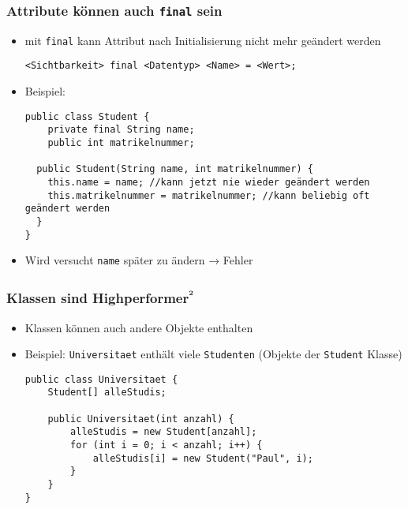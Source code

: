 \documentclass{../../presentation}
\begin{document}
\begin{frame}[fragile]
	\frametitle{Attribute können auch \texttt{final} sein}

	\begin{itemize}
		\item<2-> mit \texttt{final} kann Attribut nach Initialisierung nicht mehr geändert werden
		      \begin{verbatim}
<Sichtbarkeit> final <Datentyp> <Name> = <Wert>;
		\end{verbatim}
		\item<3-> Beispiel:
		      \begin{verbatim}
public class Student {
    private final String name;
    public int matrikelnummer;
    
  public Student(String name, int matrikelnummer) {
    this.name = name; //kann jetzt nie wieder geändert werden
    this.matrikelnummer = matrikelnummer; //kann beliebig oft geändert werden
  }
}
\end{verbatim}

		\item<4-> Wird versucht \texttt{name} später zu ändern → \alert{Fehler}
	\end{itemize}

\end{frame}

\begin{frame}[fragile]
	\frametitle{Klassen sind Highperformer\textsuperscript{²}}
	\pause
	\begin{itemize}
		\item Klassen können auch andere Objekte enthalten
		      \pause
		\item Beispiel: \texttt{Universitaet} enthält viele \texttt{Studenten} (Objekte der \texttt{Student} Klasse)
		      \pause
		      \begin{verbatim}
public class Universitaet {
    Student[] alleStudis;

    public Universitaet(int anzahl) {
        alleStudis = new Student[anzahl];
        for (int i = 0; i < anzahl; i++) {
            alleStudis[i] = new Student("Paul", i);
        }
    }
}
\end{verbatim}
	\end{itemize}
\end{frame}
\end{document}
